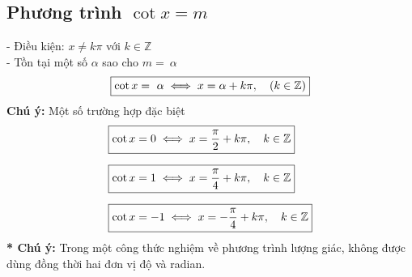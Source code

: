 \subsection{Phương trình $\cot x = m$}
\noindent\hspace*{1cm}- Điều kiện: $x \neq k\pi$ với $k \in \mathbb{Z}$\\[6pt]
\noindent\hspace*{1cm}- Tồn tại một số $\alpha$ sao cho $m = \ \alpha$
\[
    \begin{aligned}
        \fbox{$
            \cot x = \ \alpha \iff x = \alpha + k\pi, 
            \quad 
            \left(
                k \in \mathbb{Z}
            \right)      
        $}
    \end{aligned}
\]
\noindent\textbf{Chú ý:} Một số trường hợp đặc biệt
\noindent\hspace*{1cm}
\[
    \begin{aligned}
        &\fbox{$\cot x = 0 \iff x = \dfrac{\pi}{2} + k\pi, \quad k \in \mathbb{Z}$}\\[6pt]
        &\fbox{$\cot x = 1 \iff x = \dfrac{\pi}{4} + k\pi, \quad k \in \mathbb{Z}$}\\[6pt]
        &\fbox{$\cot x = -1 \iff x = -\dfrac{\pi}{4} + k\pi, \quad k \in \mathbb{Z}$}
    \end{aligned}
\]
\textbf{* Chú ý:} Trong một công thức nghiệm về phương trình lượng giác, không được dùng đồng thời hai đơn vị độ và radian.

